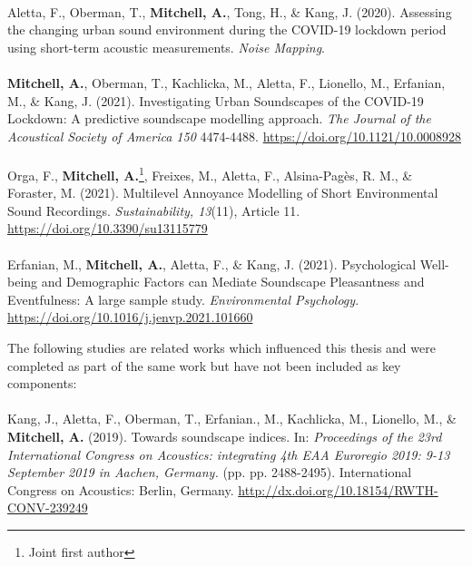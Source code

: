 \documentclass[oneside,fontsize=11pt,titlepage,chapterprefix=true
]{scrbook}
\begin{document}
\paragraph*{}
Aletta, F., Oberman, T., \textbf{Mitchell, A.}, Tong, H., \& Kang, J. (2020). Assessing the changing urban sound environment during the COVID-19 lockdown period using short-term acoustic measurements. \emph{Noise Mapping}.

\paragraph*{}
\textbf{Mitchell, A.}, Oberman, T., Kachlicka, M., Aletta, F., Lionello, M., Erfanian, M., \& Kang, J. (2021). Investigating Urban Soundscapes of the COVID-19 Lockdown: A predictive soundscape modelling approach. \emph{The Journal of the Acoustical Society of America 150} 4474-4488. \url{https://doi.org/10.1121/10.0008928}

\paragraph*{}
Orga, F., \textbf{Mitchell, A.}\footnote{Joint first author}, Freixes, M., Aletta, F., Alsina-Pagès, R. M., \& Foraster, M. (2021). Multilevel Annoyance Modelling of Short Environmental Sound Recordings. \emph{Sustainability, 13}(11), Article 11. \url{https://doi.org/10.3390/su13115779}

\paragraph*{}
Erfanian, M., \textbf{Mitchell, A.}, Aletta, F., \& Kang, J. (2021). Psychological Well-being and Demographic Factors can Mediate Soundscape Pleasantness and Eventfulness: A large sample study. \emph{Environmental Psychology}. \url{https://doi.org/10.1016/j.jenvp.2021.101660}


\newpage
The following studies are related works which influenced this thesis and were completed as part of the same work but have not been included as key components:

\paragraph*{}
Kang, J., Aletta, F., Oberman, T., Erfanian., M., Kachlicka, M., Lionello, M., \& \textbf{Mitchell, A.} (2019). Towards soundscape indices. In: \emph{Proceedings of the 23rd International Congress on Acoustics: integrating 4th EAA Euroregio 2019: 9-13 September 2019 in Aachen, Germany.} (pp. pp. 2488-2495). International Congress on Acoustics: Berlin, Germany. \url{http://dx.doi.org/10.18154/RWTH-CONV-239249}
\end{document}
